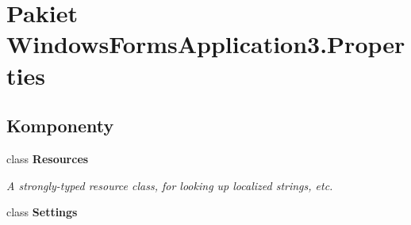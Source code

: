 \hypertarget{namespace_windows_forms_application3_1_1_properties}{}\section{Pakiet Windows\+Forms\+Application3.\+Properties}
\label{namespace_windows_forms_application3_1_1_properties}
\subsection*{Komponenty}
\begin{DoxyCompactItemize}
\item 
class {\bfseries Resources}
\begin{DoxyCompactList}\small\item\em A strongly-\/typed resource class, for looking up localized strings, etc. \end{DoxyCompactList}\item 
class {\bfseries Settings}
\end{DoxyCompactItemize}
